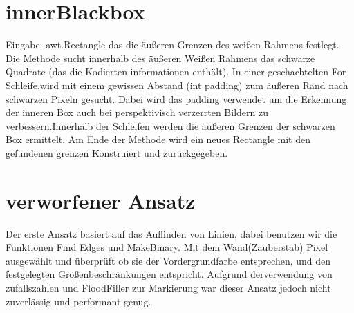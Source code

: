 \documentclass[a4paper,11pt,parskip]{article}
\begin{document}
\section{innerBlackbox}
Eingabe: awt.Rectangle das die äußeren Grenzen des weißen Rahmens festlegt.
Die Methode sucht innerhalb des äußeren Weißen Rahmens das schwarze Quadrate (das die Kodierten informationen enthält). In einer geschachtelten For Schleife,wird mit einem gewissen Abstand (int padding) zum äußeren Rand nach schwarzen Pixeln gesucht. Dabei wird das padding verwendet um die Erkennung der inneren Box auch bei perspektivisch verzerrten Bildern zu verbessern.Innerhalb der Schleifen werden die äußeren Grenzen der schwarzen Box ermittelt. Am Ende der Methode wird ein neues Rectangle mit den gefundenen grenzen Konstruiert und zurückgegeben.


\section{verworfener Ansatz}
Der erste Ansatz basiert auf das Auffinden von Linien, dabei benutzen wir die Funktionen Find Edges und MakeBinary. Mit dem Wand(Zauberstab) Pixel ausgewählt und überprüft ob sie der Vordergrundfarbe entsprechen, und den festgelegten Größenbeschränkungen entspricht. Aufgrund derverwendung von zufallszahlen und FloodFiller zur Markierung war dieser Ansatz jedoch nicht zuverlässig und performant genug.
\end{document}
